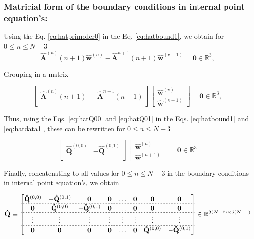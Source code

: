 \subsubsection{Matricial form of the boundary conditions in internal point equation's:}

Using %
the Eq. \ref{eq:hatprimeder0} in 
the Eq. \ref{eq:hatbound1},
we obtain for $0 \leq n\leq N-3$
\begin{equation}
 \mathbf{\hat{A}}^{(n)}(n+1) \mathbf{\hat{w}}^{(n)} - \mathbf{\hat{A}}^{n+1}(n+1) \mathbf{\hat{w}}^{(n+1)} 
 =
 \mathbf{0} \in \mathbb{R}^{3},
\end{equation}

Grouping in a matrix

\begin{equation}\label{eq:hatdata1}
\begin{bmatrix}
\mathbf{\hat{A}}^{(n)}(n+1) & -\mathbf{\hat{A}}^{n+1}(n+1)\\
\end{bmatrix}
\begin{bmatrix}
\mathbf{\hat{w}}^{(n)}\\
\mathbf{\hat{w}}^{(n+1)}
\end{bmatrix}
=\mathbf{0}\in \mathbb{R}^{3},
\end{equation}

Thus,
using the Eqs. \ref{eq:hatQ00} and \ref{eq:hatQ01} in 
the Eqs. \ref{eq:hatbound1} and \ref{eq:hatdata1}, 
these can be rewritten for $0 \leq n\leq N-3$

\begin{equation}
\begin{bmatrix}
\mathbf{\hat{Q}}^{(0,0)} & -\mathbf{\hat{Q}}^{(0,1)}\\
\end{bmatrix}
\begin{bmatrix}
\mathbf{\hat{w}}^{(n)}\\
\mathbf{\hat{w}}^{(n+1)}
\end{bmatrix}
=\mathbf{0}\in \mathbb{R}^{3}
\end{equation}

Finally, 
concatenating to all values for $0 \leq n\leq N-3$
in the boundary conditions in internal point equation's, we obtain

\begin{equation}
\mathbf{\hat{Q}}
\equiv
\begin{bmatrix}
\mathbf{\hat{Q}}^{(0,0)} & -\mathbf{\hat{Q}}^{(0,1)} & \mathbf{0} & \mathbf{0} & \hdots & \mathbf{0} & \mathbf{0} & \mathbf{0}\\ \hdashline[2pt/2pt]
\mathbf{0} & \mathbf{\hat{Q}}^{(0,0)} & -\mathbf{\hat{Q}}^{(0,1)} & \mathbf{0} & \hdots & \mathbf{0} & \mathbf{0} & \mathbf{0}\\ \hdashline[2pt/2pt]
\vdots     & \vdots             & \vdots             & \vdots     & \vdots & \vdots     & \vdots     & \vdots    \\ \hdashline[2pt/2pt]
\mathbf{0} & \mathbf{0}         & \mathbf{0}         & \mathbf{0} & \hdots & \mathbf{0} & \mathbf{\hat{Q}}^{(0,0)} & -\mathbf{\hat{Q}}^{(0,1)}\\
\end{bmatrix}
\in \mathbb{R}^{3(N-2)\times 6(N-1)}
\end{equation}

